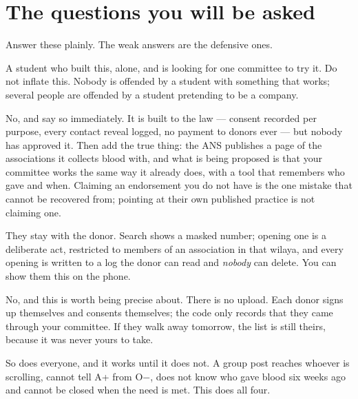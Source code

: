 \documentclass[11pt,a4paper]{article}
\begin{document}
\section{The questions you will be asked}

Answer these plainly. The weak answers are the defensive ones.

\begin{description}[leftmargin=0em, style=unboxed]

\item[``Who are you?''] A student who built this, alone, and is looking for one
committee to try it. Do not inflate this. Nobody is offended by a student with
something that works; several people are offended by a student pretending to be
a company.

\item[``Is this official? Approved by the Agence Nationale du Sang?''] No, and
say so immediately. It is built to the law --- consent recorded per purpose,
every contact reveal logged, no payment to donors ever --- but nobody has
approved it. Then add the true thing: the ANS publishes a page of the
associations it collects blood with, and what is being proposed is that your
committee works the same way it already does, with a tool that remembers who
gave and when. Claiming an endorsement you do not have is the one mistake that
cannot be recovered from; pointing at their own published practice is not
claiming one.

\item[``What happens to our donors' phone numbers?''] They stay with the donor.
Search shows a masked number; opening one is a deliberate act, restricted to
members of an association in that wilaya, and every opening is written to a log
the donor can read and \emph{nobody} can delete. You can show them this on the
phone.

\item[``Are you taking our list?''] No, and this is worth being precise about.
There is no upload. Each donor signs up themselves and consents themselves; the
code only records that they came through your committee. If they walk away
tomorrow, the list is still theirs, because it was never yours to take.

\item[``We already have a Facebook group.''] So does everyone, and it works
until it does not. A group post reaches whoever is scrolling, cannot tell A+
from O$-$, does not know who gave blood six weeks ago and cannot be closed when
the need is met. This does all four.


\end{description}
\end{document}
